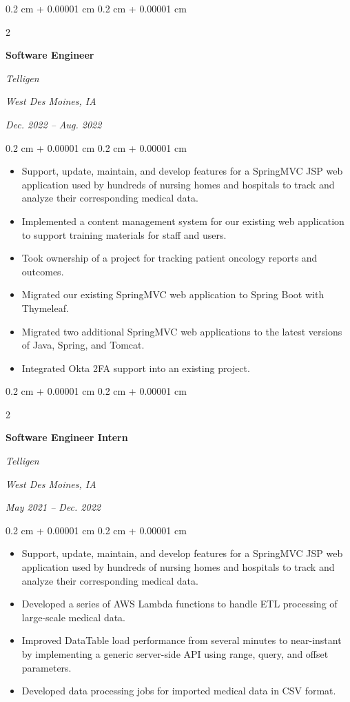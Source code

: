 \documentclass[10pt, letterpaper]{article}
\newenvironment{highlights}{
    \begin{itemize}[
        topsep=0.10 cm,
        parsep=0.10 cm,
        partopsep=0pt,
        itemsep=0pt,
        leftmargin=0.4 cm + 10pt
    ]
}{
    \end{itemize}
} %
\newenvironment{onecolentry}{
    \begin{adjustwidth}{
        0.2 cm + 0.00001 cm
    }{
        0.2 cm + 0.00001 cm
    }
}{
    \end{adjustwidth}
} %
\newenvironment{twocolentry}[2][]{
    \onecolentry
    \def\secondColumn{#2}
    \setcolumnwidth{\fill, 4.5 cm}
    \begin{paracol}{2}
}{
    \switchcolumn \raggedleft \secondColumn
    \end{paracol}
    \endonecolentry
} %
\begin{document}
\begin{twocolentry}{
		\textit{West Des Moines, IA}    
		            
		\textit{Dec. 2022 – Aug. 2022}}
	\textbf{Software Engineer}
	            
	\textit{Telligen}
\end{twocolentry}

\vspace{0.10 cm}
\begin{onecolentry}
	\begin{highlights}
		\item Support, update, maintain, and develop features for a SpringMVC JSP web application used by hundreds of nursing homes and hospitals to track and analyze their corresponding medical data.
		\item Implemented a content management system for our existing web application to support training materials for staff and users.
		\item Took ownership of a project for tracking patient oncology reports and outcomes.
		\item Migrated our existing SpringMVC web application to Spring Boot with Thymeleaf.
		\item Migrated two additional SpringMVC web applications to the latest versions of Java, Spring, and Tomcat.
		\item Integrated Okta 2FA support into an existing project.
	\end{highlights}
\end{onecolentry}

\vspace{0.2 cm}

\begin{twocolentry}{
		\textit{West Des Moines, IA}    
		            
		\textit{May 2021 – Dec. 2022}}
	\textbf{Software Engineer Intern}
	            
	\textit{Telligen}
\end{twocolentry}

\vspace{0.10 cm}
\begin{onecolentry}
	\begin{highlights}
		\item Support, update, maintain, and develop features for a SpringMVC JSP web application used by hundreds of nursing homes and hospitals to track and analyze their corresponding medical data.
		\item Developed a series of AWS Lambda functions to handle ETL processing of large-scale medical data.
		\item Improved DataTable load performance from several minutes to near-instant by implementing a generic server-side API using range, query, and offset parameters.
		\item Developed data processing jobs for imported medical data in CSV format.
	\end{highlights}
\end{onecolentry}
\end{document}
